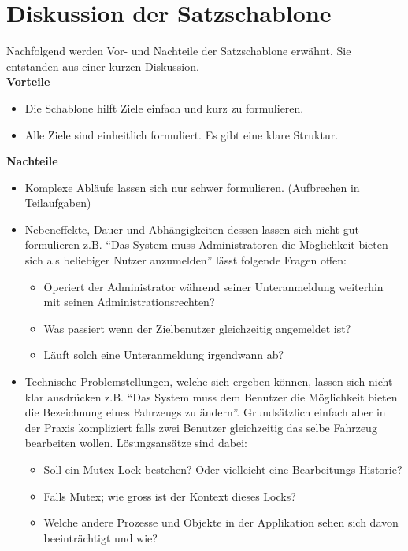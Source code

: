 \section{Diskussion der Satzschablone}
Nachfolgend werden Vor- und Nachteile der Satzschablone erwähnt. Sie entstanden aus einer kurzen Diskussion.\\[2ex]
\textbf{Vorteile}
\begin{itemize}
\item Die Schablone hilft Ziele einfach und kurz zu formulieren.
\item Alle Ziele sind einheitlich formuliert. Es gibt eine klare Struktur.
\end{itemize}
%
\textbf{Nachteile}
\begin{itemize}
\item Komplexe Abläufe lassen sich nur schwer formulieren. (Aufbrechen in Teilaufgaben)
\item Nebeneffekte, Dauer und Abhängigkeiten dessen lassen sich nicht gut formulieren z.B. ``Das System muss Administratoren die Möglichkeit bieten sich als beliebiger Nutzer anzumelden'' lässt folgende Fragen offen:
    \begin{itemize}
    \item Operiert der Administrator während seiner Unteranmeldung weiterhin mit seinen Administrationsrechten?
    \item Was passiert wenn der Zielbenutzer gleichzeitig angemeldet ist?
    \item Läuft solch eine Unteranmeldung irgendwann ab?
    \end{itemize}
\item Technische Problemstellungen, welche sich ergeben können, lassen sich nicht klar ausdrücken z.B. ``Das System muss dem Benutzer die Möglichkeit bieten die Bezeichnung eines Fahrzeugs zu ändern''. Grundsätzlich einfach aber in der Praxis kompliziert falls zwei Benutzer gleichzeitig das selbe Fahrzeug bearbeiten wollen. Lösungsansätze sind dabei:
    \begin{itemize}
    \item Soll ein Mutex-Lock bestehen? Oder vielleicht eine Bearbeitungs-Historie?
    \item Falls Mutex; wie gross ist der Kontext dieses Locks? 
    \item Welche andere Prozesse und Objekte in der Applikation sehen sich davon beeinträchtigt und wie?
    \end{itemize}
\end{itemize}
